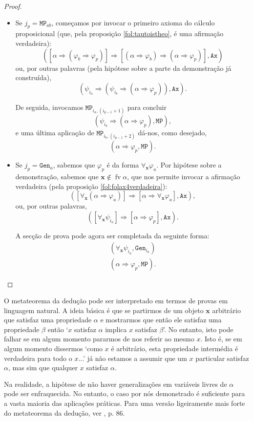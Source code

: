 \documentclass{report}
\theoremstyle{definition}
\theoremstyle{remark}
\renewcommand{\bf}[1]{\mathbf{#1}}
\DeclareMathOperator{\fv}{fv}
\newcommand{\imply}{\mathbin{\Rightarrow}}
\begin{document}
\begin{proof}
\begin{itemize}
	\item Se $j_p = \mathtt{MP}_{ab}$, começamos por invocar o primeiro axioma do cálculo proposicional (que, pela proposição \ref{fol:tautoistheo}, é uma afirmação verdadeira):
	\[([\alpha \imply (\varphi_b \imply \varphi_p)] \imply [(\alpha \imply \varphi_b) \imply (\alpha \imply \varphi_p)], \texttt{Ax})\]
	ou, por outras palavras (pela hipótese sobre a parte da demonstração já construída),
	\[(\psi_{i_a} \imply (\psi_{i_b} \imply (\alpha \imply \varphi_p)), \texttt{Ax}).\]
	
	De seguida, invocamos $\mathtt{MP}_{i_a, (i_{p-1}+1)}$ para concluir
	\[(\psi_{i_b} \imply (\alpha \imply \varphi_p), \texttt{MP}),\]
	e uma última aplicação de $\mathtt{MP}_{i_b, (i_{p-1}+2)}$ dá-nos, como desejado,
	\[(\alpha \imply \varphi_p, \texttt{MP}).\]
	
	\item Se $j_p = \mathtt{Gen}_a$, sabemos que $\varphi_p$ é da forma $\forall_{\bf x} \varphi_a$. Por hipótese sobre a demonstração, sabemos que $\bf x \not \in \fv \alpha$, que nos permite invocar a afirmação verdadeira (pela proposição \ref{fol:folax4verdadeira}):
	\[([\forall_{\bf x} (\alpha \imply \varphi_a)] \imply [\alpha \imply \forall_{\bf x} \varphi_a], \mathtt{Ax}),\]
	ou, por outras palavras,
	\[([\forall_{\bf x} \psi_{i_a}] \imply [\alpha \imply \varphi_p], \mathtt{Ax}).\]
	
	A secção de prova pode agora ser completada da seguinte forma:
	\begin{gather*}
	(\forall_{\bf x} \psi_{i_a}, \mathtt{Gen}_{i_a})\\
	(\alpha \imply \varphi_p, \mathtt{MP}).
	\end{gather*}
	\end{itemize}
	\end{proof}
	
	O metateorema da dedução pode ser interpretado em termos de provas em linguagem natural. A ideia básica é que se partirmos de um objeto $\bf x$ arbitrário que satisfaz uma propriedade $\alpha$ e mostrarmos que então ele satisfaz uma propriedade $\beta$ então `$x$ satisfaz $\alpha$ implica $x$ satisfaz $\beta$'. No entanto, isto pode falhar se em algum momento pararmos de nos referir ao mesmo $x$. Isto é, se em algum momento dissermos `como $x$ é arbitrário, esta propriedade intermédia é verdadeira para todo o $x$...' já não estamos a assumir que um $x$ particular satisfaz $\alpha$, mas sim que qualquer $x$ satisfaz $\alpha$.
	
	Na realidade, a hipótese de não haver generalizações em variáveis livres de $\alpha$ pode ser enfraquecida. No entanto, o caso por nós demonstrado é suficiente para a vasta maioria das aplicações práticas. Para uma versão ligeiramente mais forte do metateorema da dedução, ver \cite{fltc}, p. 86.
	
\end{document}
